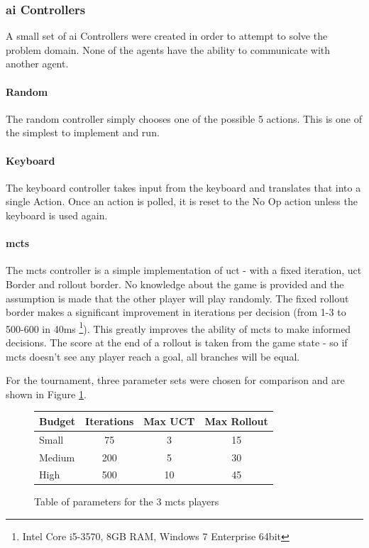 \documentclass{IEEEtran}
\begin{document}
\subsubsection{\gls{ai} Controllers}
A small set of \gls{ai} Controllers were created in order to attempt to solve the problem domain. None of the agents have the ability to communicate with another agent.
\paragraph{Random}
The random controller simply chooses one of the possible 5 actions. This is one of the simplest to implement and run.
\paragraph{Keyboard}
The keyboard controller takes input from the keyboard and translates that into a single Action. Once an action is polled, it is reset to the No Op action unless the keyboard is used again. 
\paragraph{\gls{mcts}}
The \gls{mcts} controller is a simple implementation of \gls{uct} - with a fixed iteration, \gls{uct} Border and rollout border. No knowledge about the game is provided and the assumption is made that the other player will play randomly. The fixed rollout border makes a significant improvement in iterations per decision (from 1-3 to 500-600 in 40ms \footnote{Intel Core i5-3570, 8GB RAM, Windows 7 Enterprise 64bit}). This greatly improves the ability of \gls{mcts} to make informed decisions. The score at the end of a rollout is taken from the game state - so if \gls{mcts} doesn't see any player reach a goal, all branches will be equal.

For the tournament, three parameter sets were chosen for comparison and are shown in Figure \ref{mctsTable}.
\begin{figure}[h]
\centering
\begin{tabular}{| l | c | c | c |}
\hline
\textbf{Budget} & \textbf{Iterations} & \textbf{Max UCT} & \textbf{Max Rollout} \\
\hline
Small & 75 & 3 & 15 \\
Medium & 200 & 5 & 30 \\
High & 500 & 10 & 45 \\
\hline
\end{tabular}
\caption{Table of parameters for the 3 \gls{mcts} players}
\label{mctsTable}
\end{figure}
\end{document}

